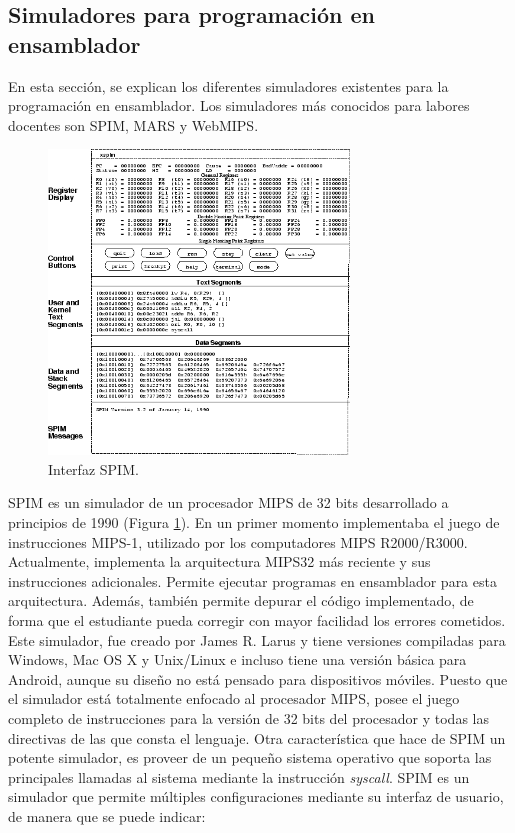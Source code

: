 \subsection{Simuladores para programación en ensamblador}
\label{sec:simuladores_ensamblador}
En esta sección, se explican los diferentes simuladores existentes para la programación en ensamblador. Los simuladores más conocidos para labores docentes son SPIM, MARS y WebMIPS.

\begin{figure}[htbp]
 	\centering
 	\includegraphics[width=8cm]{figures/spim_figure}
 	\caption{Interfaz SPIM.}
	\label{fig:spim_figure}
\end{figure}

SPIM \cite{larus1990spim} es un simulador de un procesador MIPS de 32 bits desarrollado a principios de 1990 (Figura \ref{fig:spim_figure}). En un primer momento implementaba el juego de instrucciones MIPS-1, utilizado por los computadores MIPS R2000/R3000. Actualmente, implementa la arquitectura MIPS32 más reciente y sus instrucciones adicionales. Permite ejecutar programas en ensamblador para esta arquitectura. Además, también permite depurar el código implementado, de forma que el estudiante pueda corregir con mayor facilidad los errores cometidos. Este simulador, fue creado por James R. Larus y tiene versiones compiladas para Windows, Mac OS X y Unix/Linux e incluso tiene una versión básica para Android, aunque su diseño no está pensado para dispositivos móviles. Puesto que el simulador está totalmente enfocado al procesador MIPS, posee el juego completo de instrucciones para la versión de 32 bits del procesador y todas las directivas de las que consta el lenguaje. Otra característica que hace de SPIM un potente simulador, es proveer de un pequeño sistema operativo que soporta las principales llamadas al sistema mediante la instrucción \emph{syscall}. SPIM es un simulador que permite múltiples configuraciones mediante su interfaz de usuario, de manera que se puede indicar:

